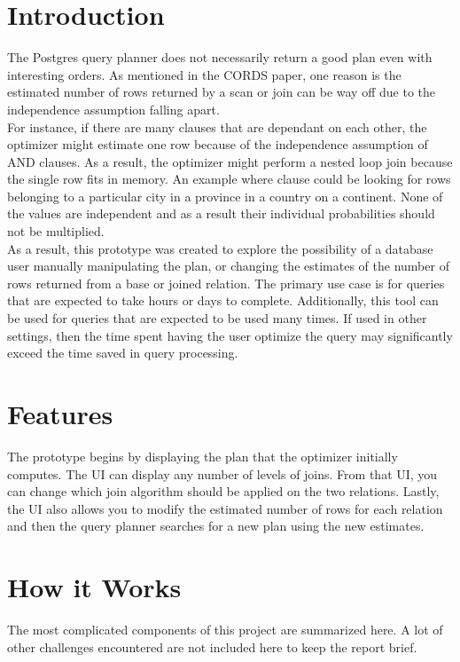 \documentclass[letterpaper,10pt]{article}
\begin{document}
\raggedright

\setlength{\columnseprule}{0.5pt}


\section{Introduction}
The Postgres query planner does not necessarily return a good plan even with
interesting orders. As mentioned in the CORDS paper, one reason is the estimated
number of rows returned by a scan or join can be way off \cite{Ilyas04} due to
the independence assumption falling apart. \\[0.5cm]

For instance, if there are many clauses that are dependant on each other,
the optimizer might estimate one row because of the independence assumption of
AND clauses. As a result, the optimizer might perform a nested loop join because
the single row fits in memory. An example where clause could be looking for rows
belonging to a particular city in a province in a country on a continent. None
of the values are independent and as a result their individual probabilities
should not be multiplied.  \\[0.5cm]

As a result, this prototype was created to explore the possibility of a database
user manually manipulating the plan, or changing the estimates of the number of
rows returned from a base or joined relation. The primary use case is for
queries that are expected to take hours or days to complete. Additionally, this
tool can be used for queries that are expected to be used many times. If used in
other settings, then the time spent having the user optimize the query may
significantly exceed the time saved in query processing.

\section{Features}
The prototype begins by displaying the plan that the optimizer initially
computes. The UI can display any number of levels of joins. From that UI, you
can change which join algorithm should be applied on the two relations. Lastly,
the UI also allows you to modify the estimated number of rows for each relation
and then the query planner searches for a new plan using the new estimates.

\section{How it Works}
The most complicated components of this project are summarized here. A lot of
other challenges encountered are not included here to keep the report brief.
\end{document}
